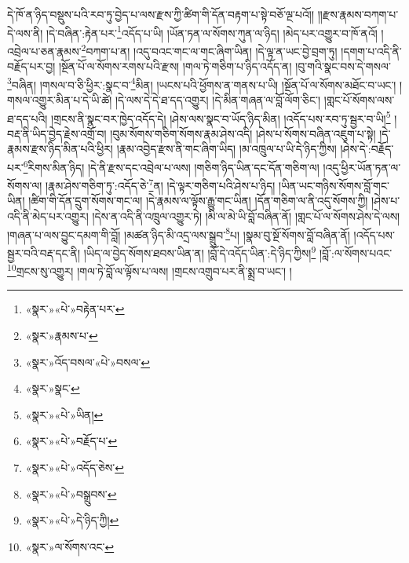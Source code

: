 དེ་ཁོ་ན་ཉིད་བསྡུས་པའི་རབ་ཏུ་བྱེད་པ་ལས་རྫས་ཀྱི་ཚིག་གི་དོན་བརྟག་པ་སྟེ་བཅོ་ལྔ་པའོ།། །།རྫས་རྣམས་བཀག་པ་དེ་ལས་ནི། །དེ་བཞིན་:རྟེན་པར་\footnote{«སྣར་»«པེ་»བརྟེན་པར་}འདོད་པ་ཡི། །ཡོན་ཏན་ལ་སོགས་ཀུན་ལ་ཉིད། །མེད་པར་འགྱུར་བ་ཁོ་ནའོ། །འབྲེལ་པ་ཅན་རྣམས་\footnote{«སྣར་»རྣམས་པ་}བཀག་པ་ན། །འདུ་བའང་གང་ལ་གང་ཞིག་ཡིན། །དེ་ལྟ་ན་ཡང་བྱེ་བྲག་ཏུ། །དགག་པ་འདི་ནི་བརྗོད་པར་བྱ། །སྔོན་པོ་ལ་སོགས་རགས་པའི་རྫས། །གལ་ཏེ་གཅིག་པ་ཉིད་འདོད་ན། །བུ་གའི་སྣང་བས་དེ་གསལ་\footnote{«སྣར་»འོད་བསལ་«པེ་»བསལ་}བཞིན། །གསལ་བ་ཅི་ཕྱིར་:སྣང་བ་\footnote{«སྣར་»སྣང་}མིན། །ཡངས་པའི་ཕྱོགས་ན་གནས་པ་ཡི། །སྔོན་པོ་ལ་སོགས་མཐོང་བ་ཡང་། །གསལ་འགྱུར་མིན་པ་དེ་ཡི་ཚེ། །དེ་ལས་དེ་དེ་ཐ་དད་འགྱུར། །དེ་མིན་གཞན་ལ་བློ་ལོག་ཅིང་། །གླང་པོ་སོགས་ལས་ཐ་དད་པའི། །གྲངས་ནི་སྣང་བར་ཁྱེད་འདོད་དེ། །ཤེས་ལས་སྣང་བ་ཡོད་ཉིད་མིན། །འདོད་པས་རབ་ཏུ་སྦྱར་བ་ཡི།\footnote{«སྣར་»«པེ་»ཡིན།} །བརྡ་ནི་ཡིད་བྱེད་རྗེས་འགྲོ་བ། །བུམ་སོགས་གཅིག་སོགས་རྣམ་ཤེས་འདི། །ཤེས་པ་སོགས་བཞིན་འཇུག་པ་སྟེ། །དེ་རྣམས་རྫས་ཉིད་མིན་པའི་ཕྱིར། །རྣམ་འབྱེད་རྫས་ནི་གང་ཞིག་ཡིད། །མ་འཁྲུལ་པ་ཡི་དེ་ཉིད་ཀྱིས། །ཤེས་དེ་:བརྗོད་པར་\footnote{«སྣར་»«པེ་»བརྗོད་པ་}རིགས་མིན་ཉིད། །དེ་ནི་རྫས་དང་འབྲེལ་པ་ལས། །གཅིག་ཉིད་ཡིན་དང་དོན་གཅིག་ལ། །འདུ་ཕྱིར་ཡོན་ཏན་ལ་སོགས་ལ། །རྣམ་ཤེས་གཅིག་ཏུ་:འདོད་ཅེ་\footnote{«སྣར་»«པེ་»འདོད་ཅེས་}ན། །དེ་ལྟར་གཅིག་པའི་ཤེས་པ་ཉིད། །ཡིན་ཡང་གཉིས་སོགས་བློ་གང་ཡིན། །ཚིག་གི་དོན་དྲུག་སོགས་གང་ལ། །དེ་རྣམས་ལ་ལྟོས་རྒྱུ་གང་ཡིན། །དོན་གཅིག་ལ་ནི་འདུ་སོགས་ཀྱི། །ཤེས་པ་འདི་ནི་མེད་པར་འགྱུར། །དེས་ན་འདི་ནི་འཁྲུལ་འགྱུར་ཏེ། །མི་ལ་མེ་ཡི་བློ་བཞིན་ནོ། །གླང་པོ་ལ་སོགས་ཤེས་དེ་ལས། །གཞན་པ་ལས་བྱུང་དམག་གི་བློ། །མཚན་ཉིད་མི་འདྲ་ལས་སྒྲུབ་\footnote{«སྣར་»«པེ་»བསྒྲུབས་}པ། །སྣམ་བུ་སྔོ་སོགས་བློ་བཞིན་ནོ། །འདོད་པས་སྦྱར་བའི་བརྡ་དང་ནི། །ཡིད་ལ་བྱེད་སོགས་ཐབས་ཡིན་ན། །བློ་དེ་འདོད་ཡིན་:དེ་ཉིད་ཀྱིས།\footnote{«སྣར་»«པེ་»དེ་ཉིད་ཀྱི།} །བློ་:ལ་སོགས་པའང་\footnote{«སྣར་»ལ་སོགས་འང་}གྲངས་སུ་འགྱུར། །གལ་ཏེ་བློ་ལ་ལྟོས་པ་ལས། །གྲངས་འགྲུབ་པར་ནི་སྨྲ་བ་ཡང་། །
